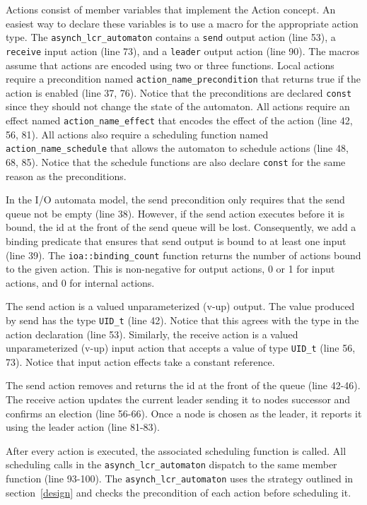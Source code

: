 Actions consist of member variables that implement the Action concept.
An easiest way to declare these variables is to use a macro for the appropriate action type.
The \verb+asynch_lcr_automaton+ contains a \verb+send+ output action (line 53), a \verb+receive+ input action (line 73), and a \verb+leader+ output action (line 90).
The macros assume that actions are encoded using two or three functions.
Local actions require a precondition named \verb+action_name_precondition+ that returns true if the action is enabled (line 37, 76).
Notice that the preconditions are declared \verb+const+ since they should not change the state of the automaton.
All actions require an effect named \verb+action_name_effect+ that encodes the effect of the action (line 42, 56, 81).
All actions also require a scheduling function named \verb+action_name_schedule+ that allows the automaton to schedule actions (line 48, 68, 85).
Notice that the schedule functions are also declare \verb+const+ for the same reason as the preconditions.

In the I/O automata model, the send precondition only requires that the send queue not be empty (line 38).
However, if the send action executes before it is bound, the id at the front of the send queue will be lost.
Consequently, we add a binding predicate that ensures that send output is bound to at least one input (line 39).
The \verb+ioa::binding_count+ function returns the number of actions bound to the given action.
This is non-negative for output actions, 0 or 1 for input actions, and 0 for internal actions.

The send action is a valued unparameterized (v-up) output.
The value produced by send has the type \verb+UID_t+ (line 42).
Notice that this agrees with the type in the action declaration (line 53).
Similarly, the receive action is a valued unparameterized (v-up) input action that accepts a value of type \verb+UID_t+ (line 56, 73).
Notice that input action effects take a constant reference.

The send action removes and returns the id at the front of the queue (line 42-46).
The receive action updates the current leader sending it to nodes successor and confirms an election (line 56-66).
Once a node is chosen as the leader, it reports it using the leader action (line 81-83).

After every action is executed, the associated scheduling function is called.
All scheduling calls in the \verb+asynch_lcr_automaton+ dispatch to the same member function (line 93-100).
The \verb+asynch_lcr_automaton+ uses the strategy outlined in section~\ref{design} and checks the precondition of each action before scheduling it.

